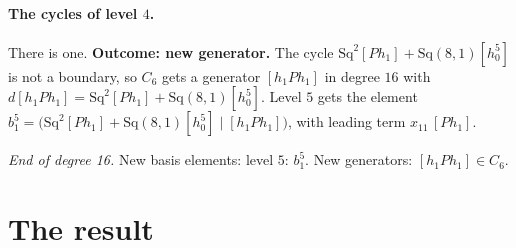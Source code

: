 \documentclass[11pt]{article}
\newcommand{\Sq}{\mathrm{Sq}}
\begin{document}
\paragraph{The cycles of level $4$.} There is one.
\textbf{Outcome: new generator.} The cycle $\Sq^{2}[Ph_1] + \Sq(8,1)[h_0^5]$ is not a boundary, so $C_{6}$ gets a generator $[h_1Ph_1]$ in degree $16$ with $d[h_1Ph_1] = \Sq^{2}[Ph_1] + \Sq(8,1)[h_0^5]$.
Level $5$ gets the element $b^{5}_{1} = \bigl(\Sq^{2}[Ph_1] + \Sq(8,1)[h_0^5] \;\big|\; [h_1Ph_1]\bigr)$, with leading term $x_{11}\,[Ph_1]$.
\medskip
\par\noindent\emph{End of degree 16.} New basis elements: level $5$: $b^{5}_{1}$. New generators: $[h_1Ph_1]\in C_{6}$.


\section{The result}
\end{document}
